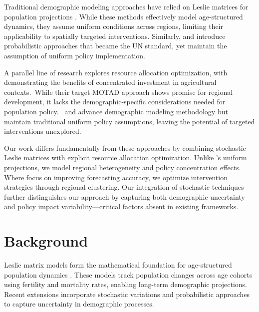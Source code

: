 \documentclass{article} %
\begin{document}
Traditional demographic modeling approaches have relied on Leslie matrices for population projections \citep{Li2018ProjectionOP, Thomas2011MoreOT, Vindenes2021IntroductionTM}. While these methods effectively model age-structured dynamics, they assume uniform conditions across regions, limiting their applicability to spatially targeted interventions. Similarly, \citet{Alkema2015TheUN} and \citet{Raftery2014BayesianPP} introduce probabilistic approaches that became the UN standard, yet maintain the assumption of uniform policy implementation.

A parallel line of research explores resource allocation optimization, with \citet{Horgli2024OptimalLR} demonstrating the benefits of concentrated investment in agricultural contexts.\ While their target MOTAD approach shows promise for regional development, it lacks the demographic-specific considerations needed for population policy.\ \citet{Alexander2024DevelopingAI} and \citet{Malafeyev2024ModelingAD} advance demographic modeling methodology but maintain traditional uniform policy assumptions, leaving the potential of targeted interventions unexplored.

Our work differs fundamentally from these approaches by combining stochastic Leslie matrices with explicit resource allocation optimization. Unlike \citet{Li2018ProjectionOP}'s uniform projections, we model regional heterogeneity and policy concentration effects. Where \citet{Raftery2014BayesianPP} focus on improving forecasting accuracy, we optimize intervention strategies through regional clustering. Our integration of stochastic techniques \citep{pmlr-v37-sohl-dickstein15} further distinguishes our approach by capturing both demographic uncertainty and policy impact variability---critical factors absent in existing frameworks.


\section{Background}
\label{sec:background}

Leslie matrix models form the mathematical foundation for age-structured population dynamics \citep{Li2018ProjectionOP, Vindenes2021IntroductionTM}. These models track population changes across age cohorts using fertility and mortality rates, enabling long-term demographic projections. Recent extensions incorporate stochastic variations \citep{pmlr-v37-sohl-dickstein15} and probabilistic approaches \citep{Alkema2015TheUN} to capture uncertainty in demographic processes.
\end{document}
